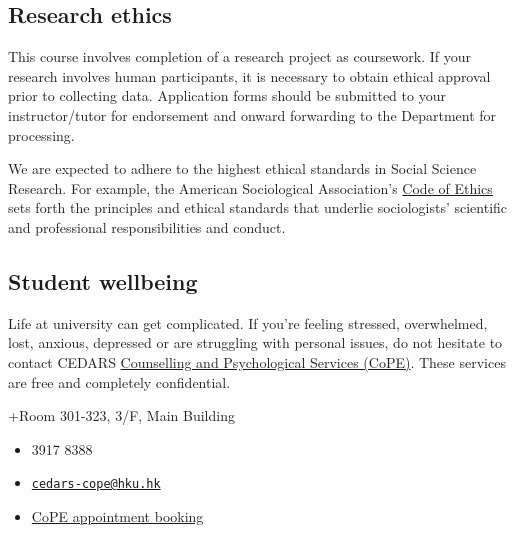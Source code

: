 \documentclass[
  letterpaper,
  DIV=11,
  numbers=noendperiod]{scrartcl}
\begin{document}
\subsection{Research ethics}\label{research-ethics}

This course involves completion of a research project as coursework. If
your research involves human participants, it is necessary to obtain
ethical approval prior to collecting data. Application forms should be
submitted to your instructor/tutor for endorsement and onward forwarding
to the Department for processing.

We are expected to adhere to the highest ethical standards in Social
Science Research. For example, the American Sociological Association's
\href{https://www.asanet.org/wp-content/uploads/asa_code_of_ethics-june2018a.pdf}{Code
of Ethics} sets forth the principles and ethical standards that underlie
sociologists' scientific and professional responsibilities and conduct.

\subsection{Student wellbeing}\label{student-wellbeing}

Life at university can get complicated. If you're feeling stressed,
overwhelmed, lost, anxious, depressed or are struggling with personal
issues, do not hesitate to contact CEDARS
\href{https://www.cedars.hku.hk/cope/cps}{Counselling and Psychological
Services (CoPE)}. These services are free and completely confidential.

+Room 301-323, 3/F, Main Building

\begin{itemize}
\item
  3917 8388
\item
  \href{mailto:cedars-cope@hku.hk}{\nolinkurl{cedars-cope@hku.hk}}
\item
  \href{https://www.cedars.hku.hk/cope/cps/appointment}{CoPE appointment
  booking}
\end{itemize}
\end{document}
